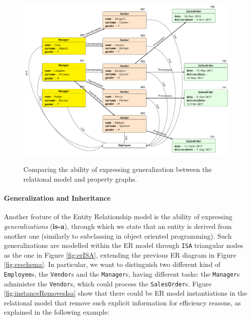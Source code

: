 \begin{figure}[!pth]
	\begin{minipage}[b]{\textwidth}
		\centering
		\includegraphics[scale=.6]{fig/02models/06graphWithRDF}
		\label{fig:graphofISAInstance}
	\end{minipage}
	\caption{Comparing the ability of expressing generalization between the relational model and property graphs. }
	\label{fig:relationalinstance}
\end{figure}

\paragraph*{Generalization and Inheritance}
Another feature of the Entity Relationship model is the ability of expressing \textit{generalizations} (\textbf{is-a}), through which we  state  that an entity is derived from another one (similarly to subclassing in object oriented programming). Such generalizations are modelled within the ER model through \texttt{ISA} triangular nodes as the one in Figure \vref{fig:erISA}, extending the previous ER diagram in Figure \ref{fig:erschema}. In particular, we want to distinguish two different kind of \texttt{Employee}s, the \texttt{Vendor}s and the \texttt{Manager}s, having different tasks: the \texttt{Manager}s administer the \texttt{Vendor}s, which could process the \texttt{SalesOrder}s. Figure \ref{fig:instanceRemovesIsa} show that there could be ER model instantiations in the relational model that remove such explicit information for efficiency reasons, as explained in the following example:

